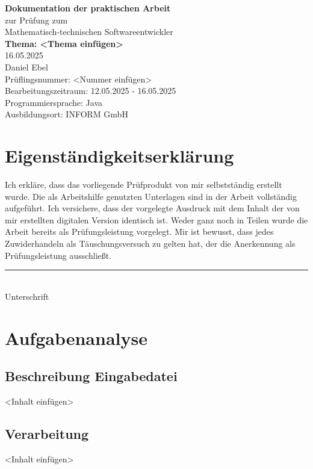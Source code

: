 \documentclass[a4paper,12pt]{report}
\begin{document}
\begin{titlepage}
    \centering
    \vspace*{3cm}
    {\Huge \textbf{Dokumentation der praktischen Arbeit}}\\[2cm]
    {\large zur Prüfung zum \\ Mathematisch-technischen Softwareentwickler}\\[2cm]
    {\Large \textbf{Thema: <Thema einfügen>}}\\[1cm]
    {16.05.2025}\\[5cm]
    {Daniel Ebel}\\[2cm]
    Prüflingsnummer: <Nummer einfügen>\\[0.5cm]
    Bearbeitungszeitraum: 12.05.2025 - 16.05.2025\\[0.5cm]
    Programmiersprache: Java\\[0.5cm]
    Ausbildungsort: INFORM GmbH
\end{titlepage}

\chapter*{Eigenständigkeitserklärung}
Ich erkläre, dass das vorliegende Prüfprodukt von mir selbstständig erstellt wurde.
Die als Arbeitshilfe genutzten Unterlagen sind in der Arbeit vollständig aufgeführt.
Ich versichere, dass der vorgelegte Ausdruck mit dem Inhalt der von mir erstellten digitalen Version identisch ist.
Weder ganz noch in Teilen wurde die Arbeit bereits als Prüfungsleistung vorgelegt.
Mir ist bewusst, dass jedes Zuwiderhandeln als Täuschungsversuch zu gelten hat, der die Anerkennung als Prüfungsleistung ausschließt.

\vspace{2cm}

\noindent\rule{7cm}{0.4pt}\\
Unterschrift

\tableofcontents
\listoffigures

\chapter{Aufgabenanalyse}
\section{Beschreibung Eingabedatei}
<Inhalt einfügen>

\section{Verarbeitung}
<Inhalt einfügen>
\end{document}
